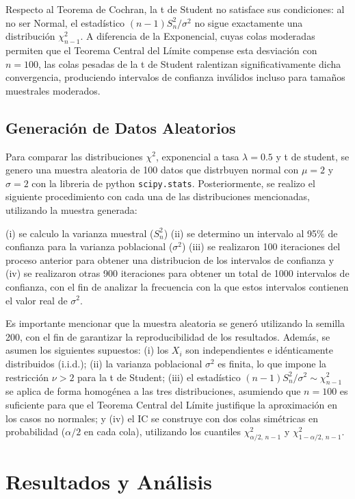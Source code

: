 \documentclass[11pt]{article}
\begin{document}
Respecto al Teorema de Cochran, la t de Student no satisface sus 
condiciones: al no ser Normal, el estadístico $(n-1)S_n^2/\sigma^2$ no sigue 
exactamente una distribución $\chi^2_{n-1}$. A diferencia de la Exponencial, 
cuyas colas moderadas permiten que el Teorema Central del Límite compense esta 
desviación con $n=100$, las colas pesadas de la t de Student ralentizan 
significativamente dicha convergencia, produciendo intervalos de confianza 
inválidos incluso para tamaños muestrales moderados.

\subsection{Generación de Datos Aleatorios}

Para comparar las distribuciones $\chi^2$, exponencial a tasa $\lambda = 0.5$ y t de student, se genero una muestra aleatoria de 100 datos que distrbuyen normal con $\mu = 2$ y $\sigma = 2$ con la libreria de python \texttt{scipy.stats}. Posteriormente, se realizo el siguiente procedimiento con cada una de las distribuciones mencionadas, utilizando la muestra generada:

(i) se calculo la varianza muestral ($S_n^2$) (ii) se determino un intervalo al 95\% de confianza para la varianza poblacional ($\sigma^2$) (iii) se realizaron 100 iteraciones del proceso anterior para obtener una distribucion de los intervalos de confianza y (iv) se realizaron otras 900 iteraciones para obtener un total de 1000 intervalos de confianza, con el fin de analizar la frecuencia con la que estos intervalos contienen el valor real de $\sigma^2$.

Es importante mencionar que la muestra aleatoria se generó utilizando la semilla 200, 
con el fin de garantizar la reproducibilidad de los resultados. Además, se asumen los 
siguientes supuestos: (i) los $X_i$ son independientes e idénticamente distribuidos 
(i.i.d.); (ii) la varianza poblacional $\sigma^2$ es finita, lo que impone la 
restricción $\nu > 2$ para la t de Student; (iii) el estadístico 
$(n-1)S_n^2/\sigma^2 \sim \chi^2_{n-1}$ se aplica de forma homogénea a las tres 
distribuciones, asumiendo que $n=100$ es suficiente para que el Teorema Central del 
Límite justifique la aproximación en los casos no normales; y (iv) el IC se construye 
con dos colas simétricas en probabilidad ($\alpha/2$ en cada cola), utilizando los 
cuantiles $\chi^2_{\alpha/2,\, n-1}$ y $\chi^2_{1-\alpha/2,\, n-1}$. 



\section{Resultados y Análisis}
\end{document}
